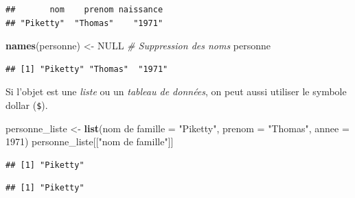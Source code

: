\documentclass[
  11pt,
]{book}
\newenvironment{Shaded}{\begin{snugshade}}{\end{snugshade}}
\newcommand{\CommentTok}[1]{\textcolor[rgb]{0.56,0.35,0.01}{\textit{#1}}}
\newcommand{\DataTypeTok}[1]{\textcolor[rgb]{0.13,0.29,0.53}{#1}}
\newcommand{\DecValTok}[1]{\textcolor[rgb]{0.00,0.00,0.81}{#1}}
\newcommand{\KeywordTok}[1]{\textcolor[rgb]{0.13,0.29,0.53}{\textbf{#1}}}
\newcommand{\NormalTok}[1]{#1}
\newcommand{\OperatorTok}[1]{\textcolor[rgb]{0.81,0.36,0.00}{\textbf{#1}}}
\newcommand{\OtherTok}[1]{\textcolor[rgb]{0.56,0.35,0.01}{#1}}
\newcommand{\StringTok}[1]{\textcolor[rgb]{0.31,0.60,0.02}{#1}}
\numberwithin{equation}{section}
\numberwithin{countremarque}{section}
\begin{document}
\begin{lstlisting}
##       nom    prenom naissance 
## "Piketty"  "Thomas"    "1971"
\end{lstlisting}

\begin{Shaded}
\begin{Highlighting}[]
\KeywordTok{names}\NormalTok{(personne) \textless{}{-}}\StringTok{ }\OtherTok{NULL} \CommentTok{\# Suppression des noms}
\NormalTok{personne}
\end{Highlighting}
\end{Shaded}

\begin{lstlisting}
## [1] "Piketty" "Thomas"  "1971"
\end{lstlisting}

Si l'objet est une \emph{liste} ou un \emph{tableau de données}, on peut aussi utiliser le symbole dollar (\texttt{\$}).

\begin{Shaded}
\begin{Highlighting}[]
\NormalTok{personne\_liste \textless{}{-}}\StringTok{ }
\StringTok{  }\KeywordTok{list}\NormalTok{(}\StringTok{\textquotesingle{}nom de famille\textquotesingle{}}\NormalTok{ =}\StringTok{ "Piketty"}\NormalTok{, }\DataTypeTok{prenom =} \StringTok{"Thomas"}\NormalTok{, }\DataTypeTok{annee =} \DecValTok{1971}\NormalTok{)}
\NormalTok{personne\_liste[[}\StringTok{"nom de famille"}\NormalTok{]]}
\end{Highlighting}
\end{Shaded}

\begin{lstlisting}
## [1] "Piketty"
\end{lstlisting}

\begin{Shaded}
\end{Shaded}

\begin{lstlisting}
## [1] "Piketty"
\end{lstlisting}

\begin{Shaded}
\end{Shaded}
\end{document}
